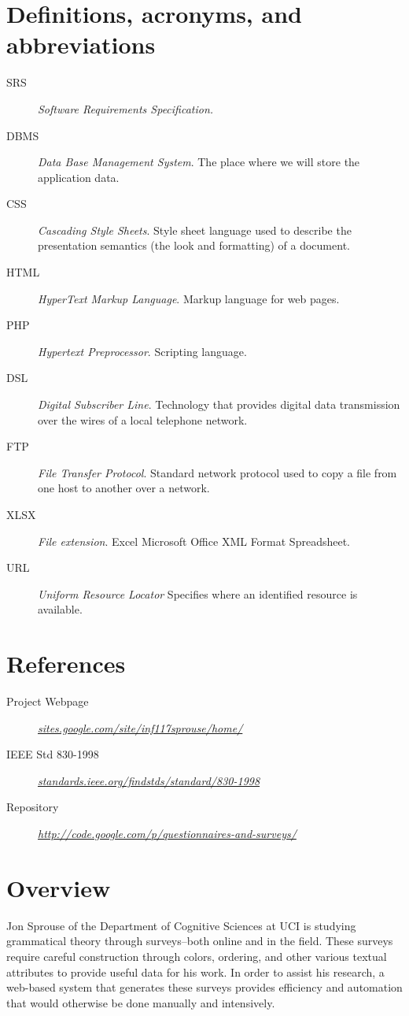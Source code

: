 \documentclass[a4paper,12pt,oneside]{report}
\begin{document}
\section{Definitions, acronyms, and abbreviations}
\begin{description}
\item[SRS] \emph{Software Requirements Specification.}
\item[DBMS] \emph{Data Base Management System}. The place where we will store the application data.
\item[CSS] \emph{Cascading Style Sheets}. Style sheet language used to describe the presentation semantics (the look and formatting) of a document.
\item[HTML] \emph{HyperText Markup Language}. Markup language for web pages.
\item[PHP] \emph{Hypertext Preprocessor}. Scripting language.
\item[DSL] \emph{Digital Subscriber Line}. Technology that provides digital data transmission over the wires of a local telephone network.
\item[FTP] \emph{File Transfer Protocol}. Standard network protocol used to copy a file from one host to another over a network.
\item[XLSX] \emph{File extension}. Excel Microsoft Office XML Format Spreadsheet.
\item[URL] \emph{Uniform Resource Locator} Specifies where an identified resource is available.
\end{description}

\section{References}
\begin{description}
\item [Project Webpage] {\it \url{  sites.google.com/site/inf117sprouse/home/}}
\item [IEEE Std 830-1998] {\it \url{ standards.ieee.org/findstds/standard/830-1998}}
\item [Repository] {\it \url{http://code.google.com/p/questionnaires-and-surveys/}}
\end{description}

\section{Overview}
Jon Sprouse of the Department of Cognitive Sciences at UCI is studying grammatical theory through surveys--both online and in the field. These surveys require careful construction through colors, ordering, and other various textual attributes to provide useful data for his work. In order to assist his research, a web-based system that generates these surveys provides efficiency and automation that would otherwise be done manually and intensively.
\end{document}
